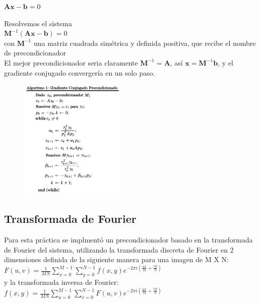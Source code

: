 \documentclass[10pt,journal,compsoc]{styles/IEEEtran}
\begin{document}
$\textbf{Ax}-\textbf{b}=0$

Resolvemos el sistema\\

$\textbf{M}^{-1}(\textbf{Ax}-\textbf{b})=0$\\

con $\textbf{M}^{-1}$ una matriz cuadrada simétrica y definida positiva, que recibe el nombre de precondicionador\\

El mejor precondicionador seria claramente $\textbf{M}^{-1}=\textbf{A}$, así $\textbf{x}=\textbf{M}^{-1}\textbf{b}$, y el gradiente conjugado convergería en un solo paso.\\

\begin{figure}[hbtp]
\centering
\includegraphics[width=0.45\textwidth]{GCPrec.png}
\caption*{}
\end{figure}

\subsection{Transformada de Fourier}

Para esta pr\'actica se implment\'o un precondicionador basado en la transformada de Fourier del sistema, utilizando la transformada discreta de Fourier en 2 dimensiones definida de la siguiente manera para una imagen de M X N:\\

$F(u,v)=\frac{1}{MN} \sum\limits_{x=0}^{M-1} \sum\limits_{y=0}^{N-1} f(x,y)e^{-2\pi i(\frac{ux}{M}+\frac{vy}{N})}$\\

y la transformada inversa de Fourier:\\

$f(x,y)=\frac{1}{MN} \sum\limits_{u=0}^{M-1} \sum\limits_{v=0}^{N-1} F(u,v)e^{-2\pi i(\frac{ux}{M}+\frac{vy}{N})}$\\
\end{document}
